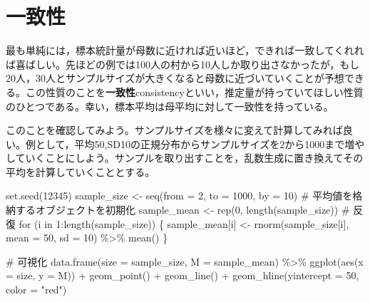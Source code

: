 \documentclass[
  a4paper,
]{ltjsbook}
\newenvironment{Shaded}{\begin{snugshade}}{\end{snugshade}}
\newcommand{\AttributeTok}[1]{\textcolor[rgb]{0.40,0.45,0.13}{#1}}
\newcommand{\CommentTok}[1]{\textcolor[rgb]{0.37,0.37,0.37}{#1}}
\newcommand{\ControlFlowTok}[1]{\textcolor[rgb]{0.00,0.23,0.31}{#1}}
\newcommand{\DecValTok}[1]{\textcolor[rgb]{0.68,0.00,0.00}{#1}}
\newcommand{\FunctionTok}[1]{\textcolor[rgb]{0.28,0.35,0.67}{#1}}
\newcommand{\NormalTok}[1]{\textcolor[rgb]{0.00,0.23,0.31}{#1}}
\newcommand{\OtherTok}[1]{\textcolor[rgb]{0.00,0.23,0.31}{#1}}
\newcommand{\SpecialCharTok}[1]{\textcolor[rgb]{0.37,0.37,0.37}{#1}}
\newcommand{\StringTok}[1]{\textcolor[rgb]{0.13,0.47,0.30}{#1}}
\begin{document}
\section{一致性}\label{ux4e00ux81f4ux6027}

最も単純には，標本統計量が母数に近ければ近いほど，できれば一致してくれれば喜ばしい。先ほどの例では100人の村から10人しか取り出さなかったが，もし20人，30人とサンプルサイズが大きくなると母数に近づいていくことが予想できる。この性質のことを\textbf{一致性}consistencyといい，推定量が持っていてほしい性質のひとつである。幸い，標本平均は母平均に対して一致性を持っている。

このことを確認してみよう。サンプルサイズを様々に変えて計算してみれば良い。例として，平均50,SD10の正規分布からサンプルサイズを2から1000まで増やしていくことにしよう。サンプルを取り出すことを，乱数生成に置き換えてその平均を計算していくこととする。

\begin{Shaded}
\begin{Highlighting}[]
\FunctionTok{set.seed}\NormalTok{(}\DecValTok{12345}\NormalTok{)}
\NormalTok{sample\_size }\OtherTok{\textless{}{-}} \FunctionTok{seq}\NormalTok{(}\AttributeTok{from =} \DecValTok{2}\NormalTok{, }\AttributeTok{to =} \DecValTok{1000}\NormalTok{, }\AttributeTok{by =} \DecValTok{10}\NormalTok{)}
\CommentTok{\# 平均値を格納するオブジェクトを初期化}
\NormalTok{sample\_mean }\OtherTok{\textless{}{-}} \FunctionTok{rep}\NormalTok{(}\DecValTok{0}\NormalTok{, }\FunctionTok{length}\NormalTok{(sample\_size))}
\CommentTok{\# 反復}
\ControlFlowTok{for}\NormalTok{ (i }\ControlFlowTok{in} \DecValTok{1}\SpecialCharTok{:}\FunctionTok{length}\NormalTok{(sample\_size)) \{}
\NormalTok{  sample\_mean[i] }\OtherTok{\textless{}{-}} \FunctionTok{rnorm}\NormalTok{(sample\_size[i], }\AttributeTok{mean =} \DecValTok{50}\NormalTok{, }\AttributeTok{sd =} \DecValTok{10}\NormalTok{) }\SpecialCharTok{\%\textgreater{}\%}
    \FunctionTok{mean}\NormalTok{()}
\NormalTok{\}}

\CommentTok{\# 可視化}
\FunctionTok{data.frame}\NormalTok{(}\AttributeTok{size =}\NormalTok{ sample\_size, }\AttributeTok{M =}\NormalTok{ sample\_mean) }\SpecialCharTok{\%\textgreater{}\%}
  \FunctionTok{ggplot}\NormalTok{(}\FunctionTok{aes}\NormalTok{(}\AttributeTok{x =}\NormalTok{ size, }\AttributeTok{y =}\NormalTok{ M)) }\SpecialCharTok{+}
  \FunctionTok{geom\_point}\NormalTok{() }\SpecialCharTok{+}
  \FunctionTok{geom\_line}\NormalTok{() }\SpecialCharTok{+}
  \FunctionTok{geom\_hline}\NormalTok{(}\AttributeTok{yintercept =} \DecValTok{50}\NormalTok{, }\AttributeTok{color =} \StringTok{"red"}\NormalTok{)}
\end{Highlighting}
\end{Shaded}
\end{document}
